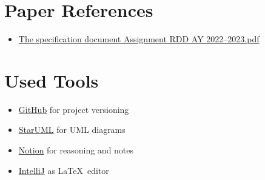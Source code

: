 \section{Paper References}
\label{sec:paper_references}%
\begin{itemize}
    \item \href{https://polimi365-my.sharepoint.com/:b:/g/personal/10685242_polimi_it/EWPABzzjfF9EsgYvSiuvdAIBAz6qnjdfLuPE8kwQSxeyCg?e=6qasKD}{The specification document Assignment RDD AY 2022--2023.pdf}
\end{itemize}


\section{Used Tools}
\label{sec:used_tools}%
\begin{itemize}
    \item \href{https://github.com/}{GitHub} for project versioning
    \item \href{https://staruml.io/}{StarUML} for UML diagrams
    \item \href{https://www.notion.so/}{Notion} for reasoning and notes
    \item \href{https://www.jetbrains.com/idea/}{IntelliJ} as \LaTeX\ editor
\end{itemize}
